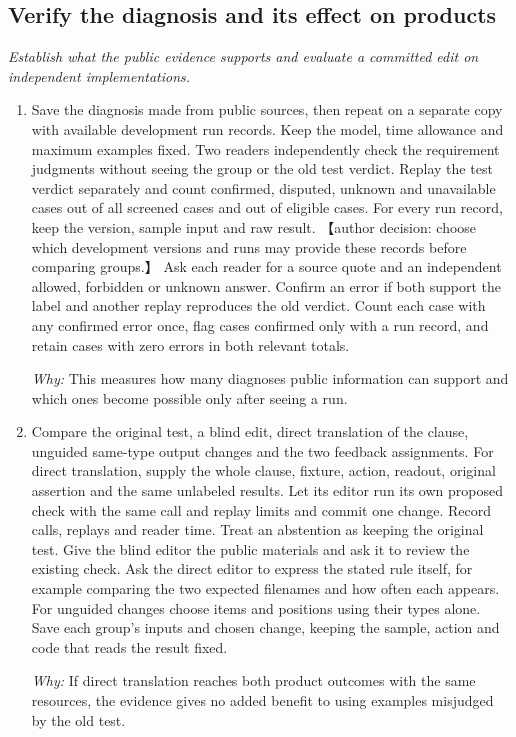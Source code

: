 \documentclass[10pt,a4paper]{article}
\begin{document}
\subsection*{Verify the diagnosis and its effect on products}
\emph{Establish what the public evidence supports and evaluate a committed edit on independent implementations.}
\begin{enumerate}[leftmargin=*,start=5]
  \item Save the diagnosis made from public sources, then repeat on a separate copy with available development run records. Keep the model, time allowance and maximum examples fixed. Two readers independently check the requirement judgments without seeing the group or the old test verdict. Replay the test verdict separately and count confirmed, disputed, unknown and unavailable cases out of all screened cases and out of eligible cases. For every run record, keep the version, sample input and raw result. 【author decision: choose which development versions and runs may provide these records before comparing groups.】 Ask each reader for a source quote and an independent allowed, forbidden or unknown answer. Confirm an error if both support the label and another replay reproduces the old verdict. Count each case with any confirmed error once, flag cases confirmed only with a run record, and retain cases with zero errors in both relevant totals.
\par\emph{Why:} This measures how many diagnoses public information can support and which ones become possible only after seeing a run.
  \item Compare the original test, a blind edit, direct translation of the clause, unguided same-type output changes and the two feedback assignments. For direct translation, supply the whole clause, fixture, action, readout, original assertion and the same unlabeled results. Let its editor run its own proposed check with the same call and replay limits and commit one change. Record calls, replays and reader time. Treat an abstention as keeping the original test. Give the blind editor the public materials and ask it to review the existing check. Ask the direct editor to express the stated rule itself, for example comparing the two expected filenames and how often each appears. For unguided changes choose items and positions using their types alone. Save each group’s inputs and chosen change, keeping the sample, action and code that reads the result fixed.
\par\emph{Why:} If direct translation reaches both product outcomes with the same resources, the evidence gives no added benefit to using examples misjudged by the old test.

\end{enumerate}
\end{document}
